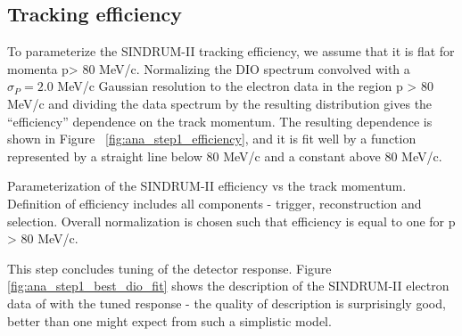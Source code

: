 \subsection{Tracking efficiency}

To parameterize the SINDRUM-II tracking efficiency, we assume that it is flat
for momenta p> 80 MeV/c.
Normalizing the DIO spectrum convolved with a $\sigma_P = 2.0$ MeV/c Gaussian resolution
to the electron data in the region p > 80 MeV/c and dividing the data spectrum
by the resulting distribution gives the ``efficiency'' dependence on the track
momentum. The resulting dependence is shown in Figure ~\ref{fig:ana_step1_efficiency}, 
and it is fit well by a function represented by a straight line below 80 MeV/c
and a constant above 80 MeV/c.

%
 {
  \label{fig:ana_step1_efficiency}
  Parameterization of the SINDRUM-II efficiency vs the track momentum.
  Definition of efficiency includes all components - trigger, reconstruction and selection.
  Overall normalization is chosen such that efficiency is equal to one for p > 80 MeV/c.
}
\vspace{0.2in}

This step concludes tuning of the detector response. Figure \ref{fig:ana_step1_best_dio_fit}
shows the description of the SINDRUM-II electron data of \cite{sindrum_ii:Bertl2006}
with the tuned response - the quality of description is surprisingly good,
better than one might expect from such a simplistic model.

